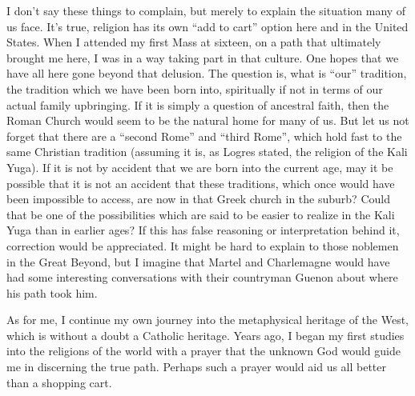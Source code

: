 \begin{footnotesize}
\begin{sffamily}
I don't say these things to complain, but merely to explain the situation many of us face. It's true, religion has its own ``add to cart'' option here and in the United States. When I attended my first Mass at sixteen, on a path that ultimately brought me here, I was in a way taking part in that culture. One hopes that we have all here gone beyond that delusion. The question is, what is ``our'' tradition, the tradition which we have been born into, spiritually if not in terms of our actual family upbringing. If it is simply a question of ancestral faith, then the Roman Church would seem to be the natural home for many of us. But let us not forget that there are a ``second Rome'' and ``third Rome'', which hold fast to the same Christian tradition (assuming it is, as Logres stated, the religion of the Kali Yuga). If it is not by accident that we are born into the current age, may it be possible that it is not an accident that these traditions, which once would have been impossible to access, are now in that Greek church in the suburb? Could that be one of the possibilities which are said to be easier to realize in the Kali Yuga than in earlier ages? If this has false reasoning or interpretation behind it, correction would be appreciated. It might be hard to explain to those noblemen in the Great Beyond, but I imagine that Martel and Charlemagne would have had some interesting conversations with their countryman Guenon about where his path took him.

As for me, I continue my own journey into the metaphysical heritage of the West, which is without a doubt a Catholic heritage. Years ago, I began my first studies into the religions of the world with a prayer that the unknown God would guide me in discerning the true path. Perhaps such a prayer would aid us all better than a shopping cart.

\hfill


\end{sffamily}
\end{footnotesize}

